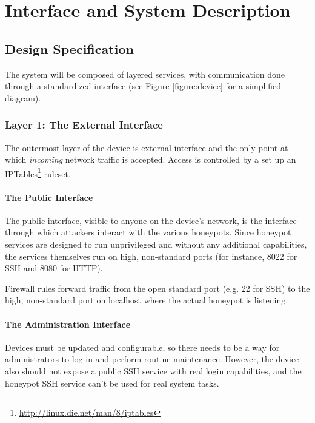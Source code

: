 \chapter{Interface and System Description}

\section{Design Specification}

The system will be composed of layered services, with communication done
through a standardized interface (see Figure \ref{figure:device} for a
simplified diagram).

\subsection{Layer 1: The External Interface}

The outermost layer of the device is external interface and the only point at
which \textit{incoming} network traffic is accepted. Access is controlled
by a set up an IPTables\footnote{\url{http://linux.die.net/man/8/iptables}}
ruleset.

\subsubsection{The Public Interface}

The public interface, visible to anyone on the device's network, is the
interface through which attackers interact with the various honeypots. Since
honeypot services are designed to run unprivileged and without any additional
capabilities, the services themselves run on high, non-standard
ports (for instance, 8022 for SSH and 8080 for HTTP).

Firewall rules forward traffic from the open standard port (e.g. 22 for SSH)
to the high, non-standard port on localhost where the actual honeypot
is listening.

\subsubsection{The Administration Interface}

Devices must be updated and configurable, so there needs to be a way for
administrators to log in and perform routine maintenance. However, the device
also should not expose a public SSH service with real login capabilities, and
the honeypot SSH service can't be used for real system tasks.

